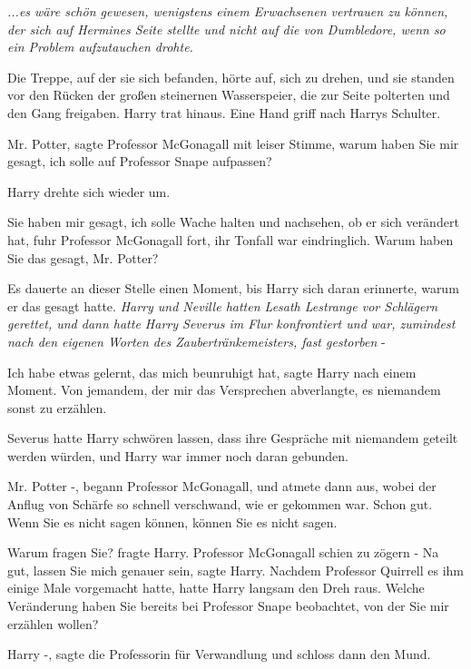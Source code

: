 \emph{...es wäre schön gewesen, wenigstens einem Erwachsenen vertrauen zu können, der sich auf Hermines Seite stellte und nicht auf die von Dumbledore, wenn so ein Problem aufzutauchen drohte. }

Die Treppe, auf der sie sich befanden, hörte auf, sich zu drehen, und sie
standen vor den Rücken der großen steinernen Wasserspeier, die zur Seite
polterten und den Gang freigaben. Harry trat hinaus. Eine Hand griff nach Harrys
Schulter.

\glqq Mr. Potter\grqq{}, sagte Professor McGonagall mit leiser Stimme, \glqq
warum haben Sie mir gesagt, ich solle auf Professor Snape aufpassen?\grqq{}

Harry drehte sich wieder um.

\glqq Sie haben mir gesagt, ich solle Wache halten und nachsehen, ob er sich
verändert hat\grqq{}, fuhr Professor McGonagall fort, ihr Tonfall war
eindringlich. \glqq Warum haben Sie das gesagt, Mr. Potter?\grqq{}

Es dauerte an dieser Stelle einen Moment, bis Harry sich daran erinnerte, warum
er das gesagt hatte. \emph{Harry und Neville hatten Lesath Lestrange vor
Schlägern gerettet, und dann hatte Harry Severus im Flur konfrontiert und war,
zumindest nach den eigenen Worten des Zaubertränkemeisters, \glqq fast
gestorben\grqq{} }-

\glqq Ich habe etwas gelernt, das mich beunruhigt hat\grqq{}, sagte Harry nach
einem Moment. \glqq Von jemandem, der mir das Versprechen abverlangte, es
niemandem sonst zu erzählen.\grqq{}

Severus hatte Harry schwören lassen, dass ihre Gespräche mit niemandem geteilt
werden würden, und Harry war immer noch daran gebunden.

\glqq Mr. Potter -\grqq{}, begann Professor McGonagall, und atmete dann aus,
wobei der Anflug von Schärfe so schnell verschwand, wie er gekommen war. \glqq
Schon gut. Wenn Sie es nicht sagen können, können Sie es nicht sagen.\grqq{}

\glqq Warum fragen Sie?\grqq{} fragte Harry. Professor McGonagall schien zu
zögern - \glqq Na gut, lassen Sie mich genauer sein\grqq{}, sagte Harry. Nachdem
Professor Quirrell es ihm einige Male vorgemacht hatte, hatte Harry langsam den
Dreh raus. \glqq Welche Veränderung haben Sie bereits bei Professor Snape
beobachtet, von der Sie mir erzählen wollen?\grqq{}

\glqq Harry -\grqq{}, sagte die Professorin für Verwandlung und schloss dann den
Mund.

